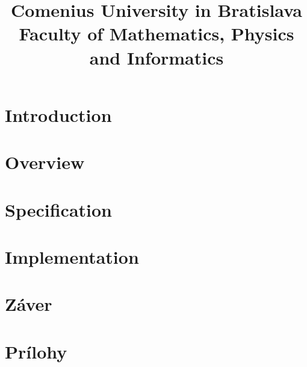 \documentclass[12pt,a4paper]{bachelor}
\title{Comenius University in Bratislava
Faculty of Mathematics, Physics and Informatics}
\author{\autor}
\begin{document}



\tableofcontents
\newpage

\chapter*{Introduction}

\chapter{Overview}


\chapter{Specification}


\chapter{Implementation}


\chapter{Záver}

\printbibliography

\chapter*{Prílohy}   %


\label{totalpages}
\end{document}
